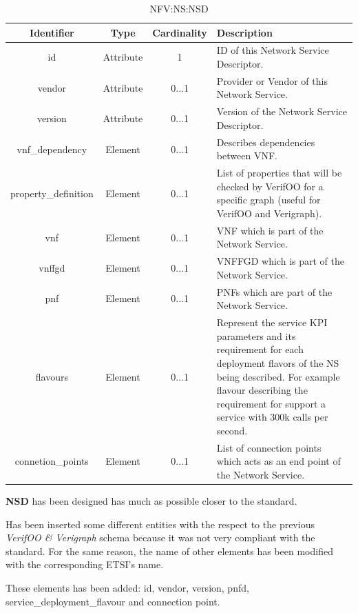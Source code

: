 \documentclass[11pt, english]{article}
\begin{document}
\begin{table}[ht]
    \centering
    \begin{tabular}{c|c|c|m{7cm}}
    \hline
    Identifier & Type & Cardinality & Description \\
    \hline
    \rowcolor{Gray}
    id & Attribute & 1 & ID of this Network Service Descriptor. \\
    \hline
    vendor & Attribute & 0...1 & Provider or Vendor of this Network Service. \\
    \hline
    \rowcolor{Gray}
    version & Attribute & 0...1 & Version of the Network Service Descriptor. \\
    \hline
    vnf\_dependency & Element & 0...1 & Describes dependencies between VNF. \\
    \hline
    \rowcolor{Gray}
    property\_definition & Element & 0...1 & List of properties that will be checked by VerifOO for a specific graph (useful for VerifOO and Verigraph). \\
    \hline
    vnf & Element & 0...1 & VNF which is part of the Network Service. \\
    \hline
    \rowcolor{Gray}
    vnffgd & Element & 0...1 & VNFFGD which is part of the Network Service. \\
    \hline
    pnf & Element & 0...1 & PNFs which are part of the Network Service. \\
    \hline
    \rowcolor{Gray}
    flavours & Element & 0...1 & Represent the service KPI parameters and its requirement for each deployment flavors of the NS being described. For example flavour describing the requirement for support a service with 300k calls per second.  \\
    \hline
    connetion\_points & Element & 0...1 & List of connection points which acts as an end point of the Network Service. \\
    \hline
    \end{tabular}
    \caption{NFV:NS:NSD} \label{tab:tab6}
\end{table}

\textbf{NSD} has been designed has much as possible closer to the standard. 

Has been inserted some different entities with the respect to the previous \emph{VerifOO \& Verigraph} schema because it was not very compliant with the standard. For the same reason, the name of other elements has been modified with the corresponding ETSI's name.

These elements has been added: id, vendor, version, pnfd, service\_deployment\_flavour and connection point.
\end{document}
